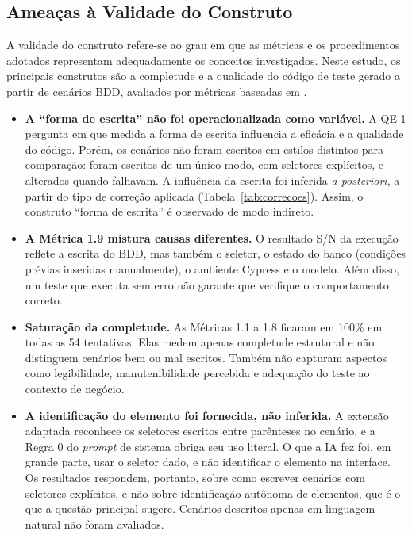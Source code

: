 \subsection{Ameaças à Validade do Construto}

A validade do construto refere-se ao grau em que as métricas e os procedimentos adotados representam adequadamente os conceitos investigados. Neste estudo, os principais construtos são a completude e a qualidade do código de teste gerado a partir de cenários BDD, avaliados por métricas baseadas em .

\begin{itemize}
    \item \textbf{A ``forma de escrita'' não foi operacionalizada como variável.} A QE-1 pergunta em que medida a forma de escrita influencia a eficácia e a qualidade do código. Porém, os cenários não foram escritos em estilos distintos para comparação: foram escritos de um único modo, com seletores explícitos, e alterados quando falhavam. A influência da escrita foi inferida \textit{a posteriori}, a partir do tipo de correção aplicada (Tabela~\ref{tab:correcoes}). Assim, o construto ``forma de escrita'' é observado de modo indireto.
    \item \textbf{A Métrica 1.9 mistura causas diferentes.} O resultado S/N da execução reflete a escrita do BDD, mas também o seletor, o estado do banco (condições prévias inseridas manualmente), o ambiente Cypress e o modelo. Além disso, um teste que executa sem erro não garante que verifique o comportamento correto.
    \item \textbf{Saturação da completude.} As Métricas 1.1 a 1.8 ficaram em 100\% em todas as 54 tentativas. Elas medem apenas completude estrutural e não distinguem cenários bem ou mal escritos. Também não capturam aspectos como legibilidade, manutenibilidade percebida e adequação do teste ao contexto de negócio.
    \item \textbf{A identificação do elemento foi fornecida, não inferida.} A extensão adaptada reconhece os seletores escritos entre parênteses no cenário, e a Regra 0 do \textit{prompt} de sistema obriga seu uso literal. O que a IA fez foi, em grande parte, usar o seletor dado, e não identificar o elemento na interface. Os resultados respondem, portanto, sobre como escrever cenários com seletores explícitos, e não sobre identificação autônoma de elementos, que é o que a questão principal sugere. Cenários descritos apenas em linguagem natural não foram avaliados.
\end{itemize}

